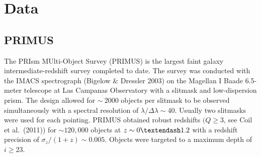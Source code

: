 
\section{Data}\label{sec:data}


\subsection{PRIMUS}\label{sec:PRIMUS}
 
The PRIsm MUlti-Object Survey (PRIMUS) is the largest faint galaxy intermediate-redshift survey completed to date.
The survey was conducted with the IMACS spectrograph (Bigelow \& Dressler 2003) on the Magellan I Baade 6.5-meter telescope at Las Campanas Observatory with a slitmask and low-dispersion prism.
The design allowed for $\sim~2000$ objects per slitmask to be observed simultaneously with a spectral resolution of ${\lambda/\Delta\lambda \sim 40}$.
Usually two slitmasks were used for each pointing.
PRIMUS obtained robust redshifts $({Q \ge 3}$, see Coil et al.~(2011)) for $\sim120,000$ objects at ${z \sim 0\textendash1.2}$ with a redshift precision of ${\sigma_{z}/(1 + z) \sim 0.005}$.
Objects were targeted to a maximum depth of ${i \ge 23}$.

